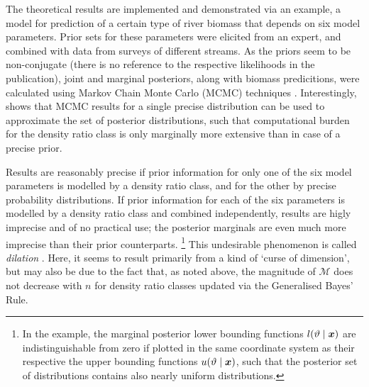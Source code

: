 The theoretical results are implemented and demonstrated via an example,
a model for prediction of a certain type of river biomass that depends on six model parameters.
Prior sets for these parameters were elicited from an expert,
and combined with data from surveys of different streams.
As the priors seem to be non-conjugate (there is no reference to the respective likelihoods in the publication),
joint and marginal posteriors, along with biomass predicitions, were calculated using
Markov Chain Monte Carlo (MCMC) techniques \parencite[see, e.g.,][]{1998:gilks}.
Interestingly, \textcite[\S 4.3]{2011:rinderknecht:diss} shows that
MCMC results for a single precise distribution can be used to approximate the set of posterior distributions,
such that computational burden for the density ratio class is only marginally more extensive than in case of a precise prior.

Results are reasonably precise if prior information for only one of the six model parameters
is modelled by a density ratio class, and for the other by precise probability distributions.
If prior information for each of the six parameters is modelled by a density ratio class and combined independently,
results are higly imprecise and of no practical use;
the posterior marginals are even much more imprecise than their prior counterparts.%
\footnote{In the example, the marginal posterior lower bounding functions $l(\vartheta\mid{\bm x})$ are indistinguishable
from zero if plotted in the same coordinate system as their respective the upper bounding functions $u(\vartheta\mid{\bm x})$,
such that the posterior set of distributions contains also nearly uniform distributions.}
This undesirable phenomenon is called \emph{dilation} \parencite[see][]{1993:seidenfeld}.
Here, it seems to result primarily from a kind of `curse of dimension',
but may also be due to the fact that, as noted above, the magnitude of $\mathcal{M}$ does not decrease with $n$
for density ratio classes updated via the Generalised Bayes' Rule.

